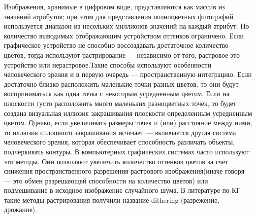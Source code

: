 \Introduction

Изображения, хранимые в цифровом виде, представляются как массив из значений атрибутов; при этом для представления полноцветных фотографий используется диапазон из несольких миллионов значений на каждый атрибут. Но  количество выводимых отображающим устройством оттенков ограничено. Если графическое устройство не способно воссоздавать достаточное количество цветов, тогда используют растрирование — независимо от того, растровое это устройство или нерастровое.Такие способы используют особенности человеческого зрения и в первую очередь — пространственную интеграцию. Если достаточно близко расположить маленькие точки разных цветов, то они будут восприниматься как одна точка с некоторым усредненным цветом. Если на плоскости густо расположить много маленьких разноцветных точек, то будет создана визуальная иллюзия закрашивания плоскости определенным усредненным цветом. Однако, если увеличивать размеры точек и (или) расстояние между ними, то иллюзия сплошного закрашивания исчезает — включается другая система человеческого зрения, которая обеспечивает способность различать объекты, подчеркивать контуры.
В компьютерных графических системах часто используют эти методы. Они позволяют увеличить количество оттенков цветов за счет снижения пространственного разрешения растрового изображения(иначе говоря — это обмен разрешающей способности на количество цветов) или подмешивание в исходное изображение случайного шума. В литературе по КГ такие методы растрирования получили название dithering (разрежение, дрожание). 

